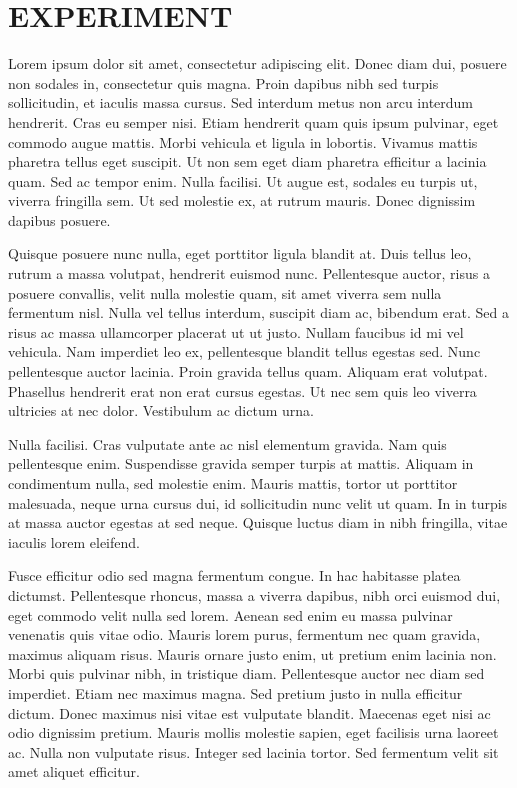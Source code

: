 \renewcommand{\chaptername}{}

\chapter{EXPERIMENT}

Lorem ipsum dolor sit amet, consectetur adipiscing elit. Donec diam dui, posuere non sodales in, consectetur quis magna. Proin dapibus nibh sed turpis sollicitudin, et iaculis massa cursus. Sed interdum metus non arcu interdum hendrerit. Cras eu semper nisi. Etiam hendrerit quam quis ipsum pulvinar, eget commodo augue mattis. Morbi vehicula et ligula in lobortis. Vivamus mattis pharetra tellus eget suscipit. Ut non sem eget diam pharetra efficitur a lacinia quam. Sed ac tempor enim. Nulla facilisi. Ut augue est, sodales eu turpis ut, viverra fringilla sem. Ut sed molestie ex, at rutrum mauris. Donec dignissim dapibus posuere.

Quisque posuere nunc nulla, eget porttitor ligula blandit at. Duis tellus leo, rutrum a massa volutpat, hendrerit euismod nunc. Pellentesque auctor, risus a posuere convallis, velit nulla molestie quam, sit amet viverra sem nulla fermentum nisl. Nulla vel tellus interdum, suscipit diam ac, bibendum erat. Sed a risus ac massa ullamcorper placerat ut ut justo. Nullam faucibus id mi vel vehicula. Nam imperdiet leo ex, pellentesque blandit tellus egestas sed. Nunc pellentesque auctor lacinia. Proin gravida tellus quam. Aliquam erat volutpat. Phasellus hendrerit erat non erat cursus egestas. Ut nec sem quis leo viverra ultricies at nec dolor. Vestibulum ac dictum urna.

Nulla facilisi. Cras vulputate ante ac nisl elementum gravida. Nam quis pellentesque enim. Suspendisse gravida semper turpis at mattis. Aliquam in condimentum nulla, sed molestie enim. Mauris mattis, tortor ut porttitor malesuada, neque urna cursus dui, id sollicitudin nunc velit ut quam. In in turpis at massa auctor egestas at sed neque. Quisque luctus diam in nibh fringilla, vitae iaculis lorem eleifend.

Fusce efficitur odio sed magna fermentum congue. In hac habitasse platea dictumst. Pellentesque rhoncus, massa a viverra dapibus, nibh orci euismod dui, eget commodo velit nulla sed lorem. Aenean sed enim eu massa pulvinar venenatis quis vitae odio. Mauris lorem purus, fermentum nec quam gravida, maximus aliquam risus. Mauris ornare justo enim, ut pretium enim lacinia non. Morbi quis pulvinar nibh, in tristique diam. Pellentesque auctor nec diam sed imperdiet. Etiam nec maximus magna. Sed pretium justo in nulla efficitur dictum. Donec maximus nisi vitae est vulputate blandit. Maecenas eget nisi ac odio dignissim pretium. Mauris mollis molestie sapien, eget facilisis urna laoreet ac. Nulla non vulputate risus. Integer sed lacinia tortor. Sed fermentum velit sit amet aliquet efficitur.

